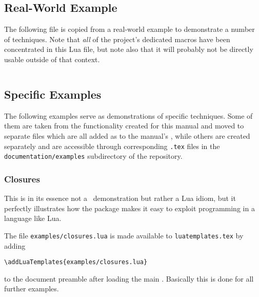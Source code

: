 \documentclass[12pt]{scrartcl}
\begin{document}
\inputminted[firstline=11]{lua}{luatemplates-manual-templates.lua}

\enlargethispage*{4\baselineskip}

\subsection{Real-World Example}
\label{sec:examples:real-world-example}

The following file is copied from a real-world example to demonstrate a number of techniques.  Note that \emph{all} of the project's dedicated macros have been concentrated in this Lua file, but note also that it will probably not be directly usable outside of that context.

\inputminted{lua}{examples/schubert-templates.lua}


\subsection{Specific Examples}
\label{sec:specific-examples}

The following examples serve as demonstrations of specific techniques.  Some of
them are taken from the functionality created for this manual and moved to
separate files which are all added as  to the manual's
, while others are created separately and are accessible
through corresponding \texttt{.tex} files in the \texttt{documentation/examples}
subdirectory of the repository.


\subsubsection{Closures}
\label{sec:examples:closures}

This is in its essence not a \luatemplates\ demonstration but rather a Lua idiom, but it perfectly illustrates how the package makes it easy to exploit programming in a language like Lua.

The file \texttt{examples/closures.lua} is made available to \texttt{luatemplates.tex} by adding

\begin{verbatim}
\addLuaTemplates{examples/closures.lua}
\end{verbatim}

\noindent to the document preamble after loading the main .  Basically this is done for all further examples.

\inputminted{lua}{examples/closure.lua}
\end{document}
